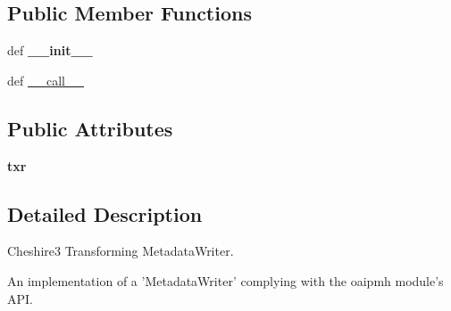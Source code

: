 \subsection*{Public Member Functions}
\begin{DoxyCompactItemize}
\item 
\hypertarget{classcheshire3_1_1web_1_1oaipmh_handler_1_1_cheshire3_oai_metadata_writer_a51ca547e5430a4c49c71052ed58f9045}{def {\bfseries \-\_\-\-\_\-init\-\_\-\-\_\-}}\label{classcheshire3_1_1web_1_1oaipmh_handler_1_1_cheshire3_oai_metadata_writer_a51ca547e5430a4c49c71052ed58f9045}

\item 
def \hyperlink{classcheshire3_1_1web_1_1oaipmh_handler_1_1_cheshire3_oai_metadata_writer_a5e51578901b36a3fc989badd132fcbd1}{\-\_\-\-\_\-call\-\_\-\-\_\-}
\end{DoxyCompactItemize}
\subsection*{Public Attributes}
\begin{DoxyCompactItemize}
\item 
\hypertarget{classcheshire3_1_1web_1_1oaipmh_handler_1_1_cheshire3_oai_metadata_writer_a9abcf72f6ce0e3a7df0ccf0a5adc9d14}{{\bfseries txr}}\label{classcheshire3_1_1web_1_1oaipmh_handler_1_1_cheshire3_oai_metadata_writer_a9abcf72f6ce0e3a7df0ccf0a5adc9d14}

\end{DoxyCompactItemize}


\subsection{Detailed Description}
\begin{DoxyVerb}Cheshire3 Transforming MetadataWriter.

An implementation of a 'MetadataWriter' complying with the oaipmh module's
API.
\end{DoxyVerb}
 

